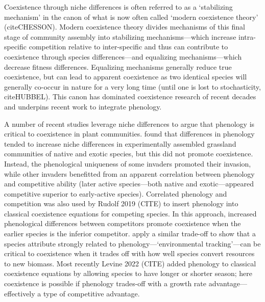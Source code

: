 \documentclass[11pt]{article}
\begin{document}
Coexistence through niche differences is often referred to as a `stabilizing mechanism' in the canon of what is now often called `modern coexistence theory' (citeCHESSON). Modern coexistence theory divides mechanisms of this final stage of community assembly into stabilizing mechanisms---which increase intra-specific competition relative to inter-specific and thus can contribute to coexistence through species differences---and equalizing mechanisms---which decrease fitness differences. Equalizing mechanisms generally reduce true coexistence, but can lead to apparent coexistence as two identical species will generally co-occur in nature for a very long time (until one is lost to stochasticity, citeHUBBEL). This canon has dominated coexistence research of recent decades and underpins recent work to integrate phenology.

A number of recent studies leverage niche differences to argue that phenology is critical to coexistence in plant communities. \citet{godoy2014} found that differences in phenology tended to increase niche differences in experimentally assembled grassland communities of native and exotic species, but this did not promote coexistence. Instead, the phenological uniqueness of some invaders promoted their invasion, while other invaders benefitted from an apparent correlation between phenology and competitive ability (later active species---both native and exotic---appeared competitive superior to early-active species). Correlated phenology and competition was also used by Rudolf 2019 (CITE) to insert phenology into classical coexistence equations for competing species. In this approach, increased phenological differences between competitors promote coexistence when the earlier species is the inferior competitor. \citet{memegan2021} apply a similar trade-off to show that a species attribute strongly related to phenology---`environmental tracking'---can be critical to coexistence when it trades off with how well species convert resources to new biomass. Most recently Levine 2022 (CITE) added phenology to classical coexistence equations by allowing species to have longer or shorter season; here coexistence is possible if phenology trades-off with a growth rate advantage---effectively a type of competitive advantage.  
\end{document}
